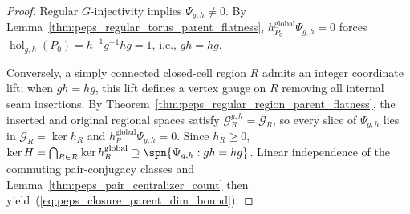\begin{proof}\leanok
    Regular $G$-injectivity implies $\Psi_{g,h}\ne 0$. By
    Lemma~\ref{thm:peps_regular_torus_parent_flatness},
    $h_{P_0}^{\mathrm{global}}\Psi_{g,h}=0$ forces
    $\operatorname{hol}_{g,h}(P_0)=h^{-1}g^{-1}hg=1$, i.e., $gh=hg$.

    Conversely, a simply connected closed-cell region $R$ admits an integer
    coordinate lift; when $gh=hg$, this lift defines a vertex gauge on $R$
    removing all internal seam insertions. By
    Theorem~\ref{thm:peps_regular_region_parent_flatness}, the inserted and
    original regional spaces satisfy $\mathcal G_R^{g,h}=\mathcal G_R$, so
    every slice of $\Psi_{g,h}$ lies in $\mathcal G_R=\ker h_R$ and
    $h_R^{\mathrm{global}}\Psi_{g,h}=0$. Since $h_R\ge 0$,
    $\ker H=\bigcap_{R\in\mathcal R}\ker h_R^{\mathrm{global}}\supseteq\spn\{\Psi_{g,h}:gh=hg\}$.
    Linear independence of the commuting pair-conjugacy classes and
    Lemma~\ref{thm:peps_pair_centralizer_count} then yield~(\ref{eq:peps_closure_parent_dim_bound}).
\end{proof}
